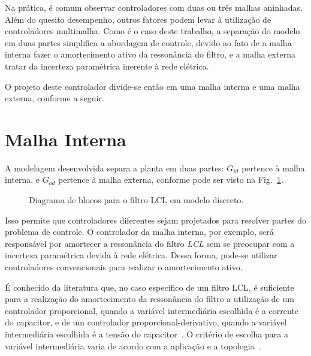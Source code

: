    Na prática, é comum observar controladores com duas ou três malhas aninhadas. Além do quesito desempenho, outros fatores podem levar à utilização de controladores multimalha. Como é o caso deste trabalho, a separação do modelo em duas partes simplifica a abordagem de controle, devido ao fato de a malha interna fazer o amortecimento ativo da ressonância do filtro, e a malha externa tratar da incerteza paramétrica inerente à rede elétrica.

    O projeto deste controlador divide-se então em uma malha interna e uma malha externa, conforme a seguir.

\section{Malha Interna}

    A modelagem desenvolvida separa a planta em duas partes: $G_{id}$ pertence à malha interna, e $G_{od}$ pertence à malha externa, conforme pode ser visto na Fig.~\ref{fig:LCL_discreto}.

    \begin{figure}[htb]
        \centering{
            \def\svgwidth{\textwidth}
            }
        \renewcommand\figurename{Fig.}
        \caption{Diagrama de blocos para o filtro LCL em modelo discreto.}
        \label{fig:LCL_discreto}
    \end{figure}

    Isso permite que controladores diferentes sejam projetados para resolver partes do problema de controle. O controlador da malha interna, por exemplo, será responsável por amortecer a ressonância do filtro \emph{LCL} sem se preocupar com a incerteza paramétrica devida à rede elétrica. Dessa forma, pode-se utilizar controladores convencionais para realizar o amortecimento ativo.

    É conhecido da literatura que, no caso específico de um filtro LCL, é suficiente para a realização do amortecimento da ressonância do filtro a utilização de um controlador proporcional, quando a variável intermediária escolhida é a corrente do capacitor, e de um controlador proporcional-derivativo, quando a variável intermediária escolhida é a tensão do capacitor~\cite{ref:DANNEHL}. O critério de escolha para a variável intermediária varia de acordo com a aplicação e a topologia~\cite{ref:POH}.

